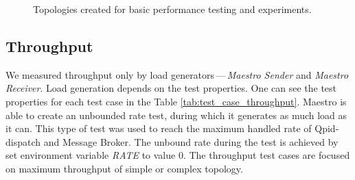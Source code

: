 \begin{figure}[h]
\begin{minipage}{0.45\linewidth}
	\end{minipage}
	\begin{minipage}{0.45\linewidth}
	\end{minipage}
	\caption[Topologies created for basic performance testing and experiments.]{Topologies created for basic performance testing and experiments.}\label{fig:basic_topologies}
\end{figure}

\subsection{Throughput}
\label{Throughput}
We measured throughput only by load generators\,---\,\emph{Maes\-tro Sender} and \emph{Maestro Receiver}. Load generation depends on the test properties. One can see the test properties for each test case in the Table \ref{tab:test_case_throughput}. Maestro is able to create an unbounded rate test, during which it generates as much load as it can. This type of test was used to reach the maximum handled rate of Qpid-dispatch and Message Broker. The unbound rate during the test is achieved by set environment variable \emph{RATE} to value 0. The throughput test cases are focused on maximum throughput of simple or complex topology.


